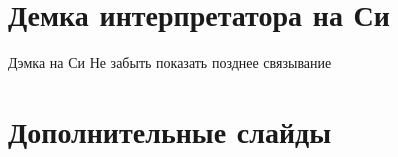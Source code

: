 \section{Демка интерпретатора на Си}
\begin{frame}{Дэмка на Си}
  Не забыть показать позднее связывание
\end{frame}

\section{Дополнительные слайды}

